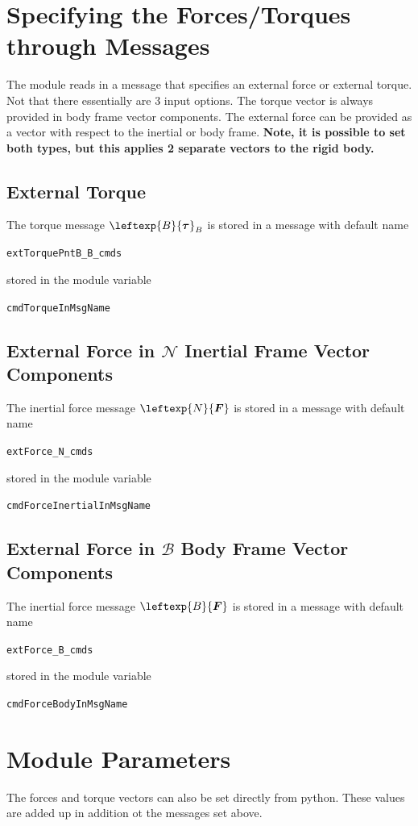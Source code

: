 \documentclass[]{BasiliskReportMemo}
\begin{document}
\section{Specifying the Forces/Torques through Messages}
The module reads in a message that specifies  an external force or external torque.  Not that there essentially are  3 input options.  The torque vector is always provided in body frame vector components.  The external force can be provided as a vector with respect to the inertial or body frame.  {\bfseries Note, it is possible to set both types, but this applies 2 separate vectors to the rigid body.}

\subsection{External Torque}
The torque message $\leftexp{B}{\bm\tau}_{B}$ is stored in a message with default name 

{\tt extTorquePntB\_B\_cmds}

\noindent stored in the module variable 

{\tt cmdTorqueInMsgName}

\subsection{External Force in $\mathcal{N}$ Inertial Frame Vector Components}
The inertial force message $\leftexp{N}{\bm F}$ is stored in a message with default name 

{\tt extForce\_N\_cmds}

\noindent stored in the module variable 

{\tt cmdForceInertialInMsgName}


\subsection{External Force in $\mathcal{B}$ Body Frame Vector Components}
The inertial force message $\leftexp{B}{\bm F}$ is stored in a message with default name 

{\tt extForce\_B\_cmds}

\noindent stored in the module variable 

{\tt cmdForceBodyInMsgName}






\section{Module Parameters}
The forces and torque vectors  can also be set directly from python.  These values are added up in addition ot the messages set above.
\end{document}
